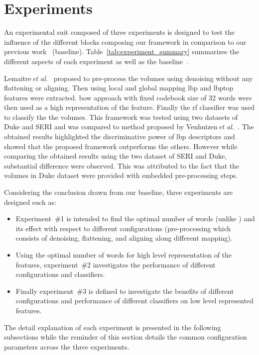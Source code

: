  \graphicspath{ {./content/experiment/figures/} }

\section{Experiments}
\label{sec:exp} 
An experimental suit composed of three experiments is designed to test the influence of the different blocks composing our framework in comparison to our previous work~\cite{Lemaintre2015miccaiOCT} (baseline).
Table~\ref{tab:experiment_summary} summarizes the different aspects of each experiment as well as the baseline~\cite{Lemaintre2015miccaiOCT}.
 
Lemaitre\,\textit{et al.}~\cite{Lemaintre2015miccaiOCT} proposed to pre-process the volumes using \nlm denoising without any flattening or aligning.
Then using local and global mapping \ac{lbp} and \ac{lbptop} features were extracted. 
\ac{bow} approach with fixed codebook size of 32 words were then used as a high representation of the feature.
Finally the \ac{rf} classifier was used to classify the the volumes. 
This framework was tested using two datasets of Duke and SERI and was compared to method proposed by Venhuizen\,\textit{et al.}~\cite{Venhuizen2015}.
The obtained results highlighted the discriminative power of \ac{lbp} descriptors and showed that the proposed framework outperforms the others.
{\color{red}However while comparing the obtained results using the two dataset of SERI and Duke, substantial difference were observed.
This was attributed to the fact that the volumes in Duke dataset were provided with embedded pre-processing steps.}

Considering the conclusion drawn from our baseline, three experiments are designed such as: 
\begin{itemize}
\item Experiment~\#1 is intended to find the optimal number of words (unlike \cite{Lemaintre2015miccaiOCT}) and its effect with respect to different configurations (pre-processing which consists of denoising, flattening, and aligning along different mapping).
\item Using the optimal number of words for high level representation of the features, experiment~\#2 investigates the performance of different configurations and classifiers.
\item Finally experiment~\#3 is defined to investigate the benefits of different configurations and performance of different classifiers on low level represented features.
\end{itemize}
The detail explanation of each experiment is presented in the following subsections while the reminder of this section details the common configuration parameters across the three experiments. 

